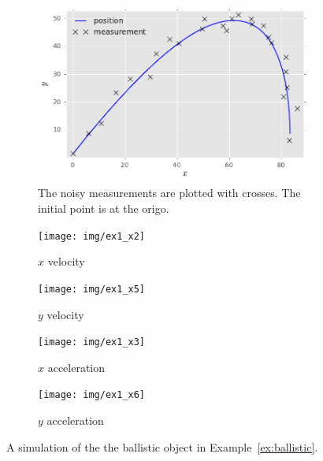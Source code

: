 \begin{figure}[htb]%
    \centering%
    \begin{subfigure}[b]{0.5\textwidth}%
    	\centering%
    	\includegraphics[width=\textwidth]{img/ex1_pos_meas}%
    	\caption{The noisy measurements are plotted with crosses. The initial point is at the origo.}%
		\label{fig:ballistic_flight}%
    \end{subfigure}
    \begin{subfigure}[b]{0.5\textwidth}%
    	\centering%
		\texttt{[image: img/ex1\_x2]}%
    	\caption{$x$ velocity}%
		\label{fig:ballistic_x2}%
    \end{subfigure}%
    \begin{subfigure}[b]{0.5\textwidth}%
    	\centering%
		\texttt{[image: img/ex1\_x5]}%
    	\caption{$y$ velocity}\label{fig:ballistic_x5}%
    \end{subfigure}
	
    \begin{subfigure}[b]{0.5\textwidth}%
    	\centering%
		\texttt{[image: img/ex1\_x3]}%
    	\caption{$x$ acceleration}\label{fig:ballistic_x3}%
    \end{subfigure}%
    \begin{subfigure}[b]{0.5\textwidth}
    	\centering%
		\texttt{[image: img/ex1\_x6]}%
    	\caption{$y$ acceleration}\label{fig:ballistic_x6}%
    \end{subfigure}%
	\caption{A simulation of the the ballistic object in 
	Example~\ref{ex:ballistic}.}
	\label{fig:ballistic}
 \end{figure}
 

